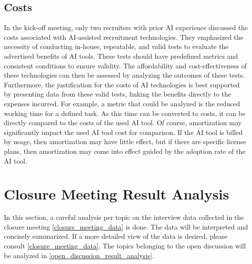 \documentclass[draft,final]{thesisclass} %
\begin{document}
\subsection{Costs}
In the kick-off meeting, only two recruiters with prior \acs{AI} experience discussed the costs associated with \acs{AI}-assisted recruitment technologies. They emphasized the necessity of conducting in-house, repeatable, and valid tests to evaluate the advertised benefits of \acs{AI} tools. These tests should have predefined metrics and consistent conditions to ensure validity. The affordability and cost-effectiveness of these technologies can then be assessed by analyzing the outcomes of these tests. Furthermore, the justification for the costs of \acs{AI} technologies is best supported by presenting data from these valid tests, linking the benefits directly to the expenses incurred. For example, a metric that could be analyzed is the reduced working time for a defined task. As this time can be converted to costs, it can be directly compared to the costs of the used \acs{AI} tool. Of course, amortization may significantly impact the used \acs{AI} tool cost for comparison. If the \acs{AI} tool is billed by usage, then amortization may have little effect, but if there are specific license plans, then amortization may come into effect guided by the adoption rate of the \acs{AI} tool.

\section{Closure Meeting Result Analysis}
In this section, a careful analysis per topic on the interview data collected in the closure meeting \ref{closure_meeting_data} is done. The data will be interpreted and concisely summarized. If a more detailed view of the data is desired, please consult \ref{closure_meeting_data}. The topics belonging to the open discussion will be analyzed in \ref{open_discussion_result_analysis}.
\end{document}
